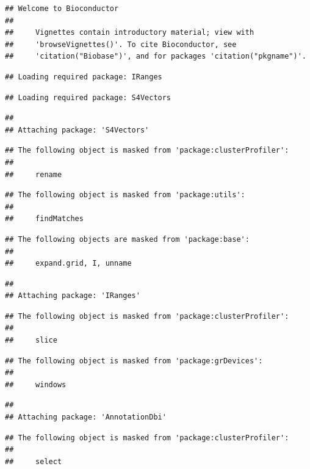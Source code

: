 \documentclass[
]{article}
\begin{document}
\begin{verbatim}
## Welcome to Bioconductor
## 
##     Vignettes contain introductory material; view with
##     'browseVignettes()'. To cite Bioconductor, see
##     'citation("Biobase")', and for packages 'citation("pkgname")'.
\end{verbatim}

\begin{verbatim}
## Loading required package: IRanges
\end{verbatim}

\begin{verbatim}
## Loading required package: S4Vectors
\end{verbatim}

\begin{verbatim}
## 
## Attaching package: 'S4Vectors'
\end{verbatim}

\begin{verbatim}
## The following object is masked from 'package:clusterProfiler':
## 
##     rename
\end{verbatim}

\begin{verbatim}
## The following object is masked from 'package:utils':
## 
##     findMatches
\end{verbatim}

\begin{verbatim}
## The following objects are masked from 'package:base':
## 
##     expand.grid, I, unname
\end{verbatim}

\begin{verbatim}
## 
## Attaching package: 'IRanges'
\end{verbatim}

\begin{verbatim}
## The following object is masked from 'package:clusterProfiler':
## 
##     slice
\end{verbatim}

\begin{verbatim}
## The following object is masked from 'package:grDevices':
## 
##     windows
\end{verbatim}

\begin{verbatim}
## 
## Attaching package: 'AnnotationDbi'
\end{verbatim}

\begin{verbatim}
## The following object is masked from 'package:clusterProfiler':
## 
##     select
\end{verbatim}
\end{document}
